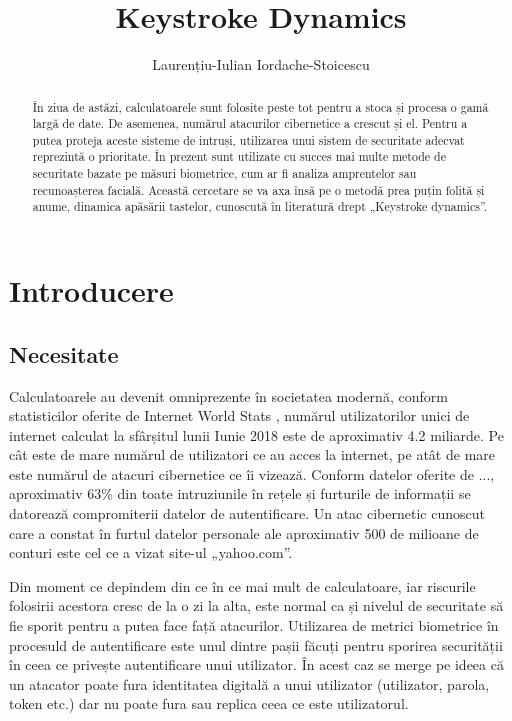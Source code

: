 \documentclass[9pt,shortpaper,twoside,web]{ieeecolor}
\begin{document}
\title{Keystroke Dynamics}
\author{Laurențiu-Iulian Iordache-Stoicescu }

\maketitle


\begin{abstract}
În ziua de astăzi, calculatoarele sunt folosite peste tot pentru a stoca și procesa o gamă largă de date. De asemenea, numărul atacurilor cibernetice a crescut și el. Pentru a putea proteja aceste sisteme de intruși, utilizarea unui sistem de securitate adecvat reprezintă o prioritate. În prezent sunt utilizate cu succes mai multe metode de securitate bazate pe măsuri biometrice, cum ar fi analiza amprentelor sau recunoașterea facială. Această cercetare se va axa însă pe o metodă prea puțin folită și anume, dinamica apăsării tastelor, cunoscută în literatură drept „Keystroke dynamics”.
\end{abstract}

\begin{IEEEkeywords}

\end{IEEEkeywords}


\section{Introducere}
\label{sec:introduction}



\subsection{Necesitate}
	Calculatoarele au devenit omniprezente în societatea modernă, conform statisticilor oferite de Internet World Stats \cite{b1}, numărul utilizatorilor unici de internet calculat la sfârșitul lunii Iunie 2018 este de aproximativ 4.2 miliarde. Pe cât este de mare numărul de utilizatori ce au acces la internet, pe atât de mare este numărul de atacuri cibernetice ce îi vizează. Conform datelor oferite de ..., aproximativ 63\% din toate intruziunile în rețele și furturile de informații se datorează compromiterii datelor de autentificare. Un atac cibernetic cunoscut care a constat în furtul datelor personale ale aproximativ 500 de milioane de conturi este cel ce a vizat site-ul „yahoo.com”.

	Din moment ce depindem din ce în ce mai mult de calculatoare, iar riscurile folosirii acestora cresc de la o zi la alta, este normal ca și nivelul de securitate să fie sporit pentru a putea face față atacurilor. Utilizarea de metrici biometrice în procesuld de autentificare este unul dintre pașii făcuți pentru sporirea securității în ceea ce privește autentificare unui utilizator. În acest caz se merge pe ideea că un atacator poate fura identitatea digitală a unui utilizator (utilizator, parola, token etc.) dar nu poate fura sau replica ceea ce este utilizatorul.
\end{document}
